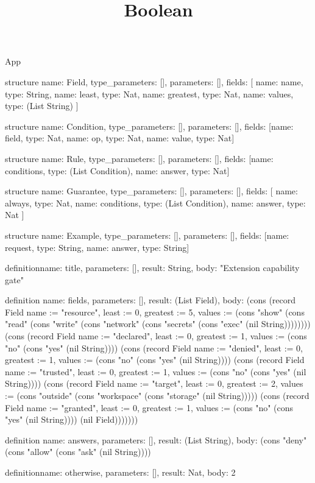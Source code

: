 \begin{lexlean}{App}
\title{Boolean}
\begin{semanticmodule}
structure{
  name: Field,
  type_parameters: [],
  parameters: [],
  fields: [
    {name: name, type: String},
    {name: least, type: Nat},
    {name: greatest, type: Nat},
    {name: values, type: (List String)}
  ]
}

structure{
  name: Condition,
  type_parameters: [],
  parameters: [],
  fields: [{name: field, type: Nat}, {name: op, type: Nat}, {name: value, type: Nat}]
}

structure{
  name: Rule,
  type_parameters: [],
  parameters: [],
  fields: [{name: conditions, type: (List Condition)}, {name: answer, type: Nat}]
}

structure{
  name: Guarantee,
  type_parameters: [],
  parameters: [],
  fields: [
    {name: always, type: Nat},
    {name: conditions, type: (List Condition)},
    {name: answer, type: Nat}
  ]
}

structure{
  name: Example,
  type_parameters: [],
  parameters: [],
  fields: [{name: request, type: String}, {name: answer, type: String}]
}

definition{name: title, parameters: [], result: String, body: "Extension capability gate"}

definition{
  name: fields,
  parameters: [],
  result: (List Field),
  body: (cons (record Field {name := "resource", least := 0, greatest := 5, values := (cons "show" (cons "read" (cons "write" (cons "network" (cons "secrets" (cons "exec" (nil String)))))))}) (cons (record Field {name := "declared", least := 0, greatest := 1, values := (cons "no" (cons "yes" (nil String)))}) (cons (record Field {name := "denied", least := 0, greatest := 1, values := (cons "no" (cons "yes" (nil String)))}) (cons (record Field {name := "trusted", least := 0, greatest := 1, values := (cons "no" (cons "yes" (nil String)))}) (cons (record Field {name := "target", least := 0, greatest := 2, values := (cons "outside" (cons "workspace" (cons "storage" (nil String))))}) (cons (record Field {name := "granted", least := 0, greatest := 1, values := (cons "no" (cons "yes" (nil String)))}) (nil Field)))))))
}

definition{
  name: answers,
  parameters: [],
  result: (List String),
  body: (cons "deny" (cons "allow" (cons "ask" (nil String))))
}

definition{name: otherwise, parameters: [], result: Nat, body: 2}


\end{semanticmodule}
\end{lexlean}
